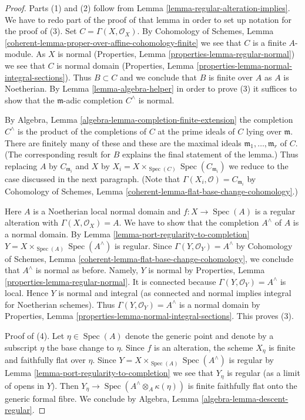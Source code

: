 \documentclass[10pt,a4paper]{amsart}
\theoremstyle{plain}
\theoremstyle{definition}
\theoremstyle{remark}
\numberwithin{equation}{subsection}
\def\Spec{\mathop{\mathrm{Spec}}}
\begin{document}
\begin{proof}
Parts (1) and (2) follow from Lemma \ref{lemma-regular-alteration-implies}.
We have to redo part of the proof of that lemma in order to set up notation
for the proof of (3). Set $C = \Gamma(X, \mathcal{O}_X)$. By
Cohomology of Schemes, Lemma
\ref{coherent-lemma-proper-over-affine-cohomology-finite}
we see that $C$ is a finite $A$-module. As $X$ is normal
(Properties, Lemma \ref{properties-lemma-regular-normal})
we see that $C$ is normal domain
(Properties, Lemma \ref{properties-lemma-normal-integral-sections}).
Thus $B \subset C$ and we conclude that $B$ is finite over $A$
as $A$ is Noetherian. By Lemma \ref{lemma-algebra-helper}
in order to prove (3) it suffices to show
that the $\mathfrak m$-adic completion $C^\wedge$ is normal.

\medskip\noindent
By Algebra, Lemma \ref{algebra-lemma-completion-finite-extension}
the completion $C^\wedge$ is the product of the completions of
$C$ at the prime ideals of $C$ lying over $\mathfrak m$.
There are finitely many of these and these are the maximal
ideals $\mathfrak m_1, \ldots, \mathfrak m_r$ of $C$.
(The corresponding result for $B$ explains the final statement of the lemma.)
Thus replacing $A$ by $C_{\mathfrak m_i}$ and $X$ by
$X_i = X \times_{\Spec(C)} \Spec(C_{\mathfrak m_i})$
we reduce to the case discussed in the next paragraph.
(Note that $\Gamma(X_i, \mathcal{O}) = C_{\mathfrak m_i}$ by
Cohomology of Schemes, Lemma \ref{coherent-lemma-flat-base-change-cohomology}.)

\medskip\noindent
Here $A$ is a Noetherian local normal domain and $f : X \to \Spec(A)$ is a
regular alteration with $\Gamma(X, \mathcal{O}_X) = A$.
We have to show that the completion $A^\wedge$
of $A$ is a normal domain. By
Lemma \ref{lemma-port-regularity-to-completion}
$Y = X \times_{\Spec(A)} \Spec(A^\wedge)$ is regular.
Since $\Gamma(Y, \mathcal{O}_Y) = A^\wedge$ by
Cohomology of Schemes, Lemma \ref{coherent-lemma-flat-base-change-cohomology},
we conclude that $A^\wedge$ is normal as before.
Namely, $Y$ is normal by
Properties, Lemma \ref{properties-lemma-regular-normal}.
It is connected because $\Gamma(Y, \mathcal{O}_Y) = A^\wedge$ is local.
Hence $Y$ is normal and integral (as connected and normal
implies integral for Noetherian schemes). Thus
$\Gamma(Y, \mathcal{O}_Y) = A^\wedge$
is a normal domain by
Properties, Lemma \ref{properties-lemma-normal-integral-sections}.
This proves (3).

\medskip\noindent
Proof of (4). Let $\eta \in \Spec(A)$ denote the generic point
and denote by a subscript $\eta$ the base change to $\eta$.
Since $f$ is an alteration, the scheme $X_\eta$ is finite and
faithfully flat over $\eta$. Since $Y = X \times_{\Spec(A)} \Spec(A^\wedge)$
is regular by Lemma \ref{lemma-port-regularity-to-completion}
we see that $Y_\eta$ is regular (as a limit of opens in $Y$).
Then $Y_\eta \to \Spec(A^\wedge \otimes_A \kappa(\eta))$ is finite
faithfully flat onto the generic formal fibre. We conclude by
Algebra, Lemma \ref{algebra-lemma-descent-regular}.
\end{proof}
\end{document}
